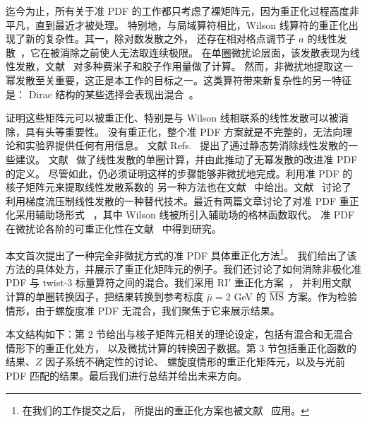 \medskip
迄今为止，所有关于准 PDF 的工作都只考虑了裸矩阵元，因为重正化过程高度非平凡，直到最近才被处理。
特别地，与局域算符相比，Wilson 线算符的重正化出现了新的复杂性。其一，除对数发散之外，
还存在相对格点调节子 $a$ 的线性发散~\cite{Dotsenko:1979wR}，它在被消除之前使人无法取连续极限。
在单圈微扰论层面，该发散表现为线性发散，文献~\cite{Constantinou:2017sej} 对多种费米子和胶子作用量做了计算。
然而，非微扰地提取这一幂发散至关重要，这正是本工作的目标之一。这类算符带来新复杂性的另一特征是：
Dirac 结构的某些选择会表现出混合~\cite{Constantinou:2017sej}。

\medskip
证明这些矩阵元可以被重正化、特别是与 Wilson 线相联系的线性发散可以被消除，具有头等重要性。
没有重正化，整个准 PDF 方案就是不完整的，无法向理论和实验界提供任何有用信息。
文献 Refs.~\cite{Ma:2014jla,Ishikawa:2016znu} 提出了通过静态势消除线性发散的一些建议。
文献~\cite{Chen:2016fxx} 做了线性发散的单圈计算，并由此推动了无幂发散的改进准 PDF 的定义。
尽管如此，仍必须证明这样的步骤能够非微扰地完成。利用准 PDF 的核子矩阵元来提取线性发散系数的
另一种方法也在文献~\cite{Constantinou:2017sej} 中给出。文献~\cite{Monahan:2016bvm} 讨论了
利用梯度流压制线性发散的一种替代技术。最近有两篇文章讨论了对准 PDF 重正化采用辅助场形式
~\cite{Ji:2017oey,Green:2017xeu}，其中 Wilson 线被所引入辅助场的格林函数取代。
准 PDF 在微扰论各阶的可重正化性在文献~\cite{Ishikawa:2017faj} 中得到研究。

\medskip
本文首次提出了一种完全非微扰方式的准 PDF 具体重正化方法\footnote{在我们的工作提交之后，
所提出的重正化方案也被文献~\cite{Chen:2017mzz} 应用。}。
我们给出了该方法的具体处方，并展示了重正化矩阵元的例子。我们还讨论了如何消除非极化准 PDF
与 twist-3 标量算符之间的混合。我们采用 RI$'$ 重正化方案~\cite{Martinelli:1994ty}，
并利用文献~\cite{Constantinou:2017sej} 计算的单圈转换因子，把结果转换到参考标度 $\bar\mu{=}2$ GeV 的
${\overline{\rm MS}}$ 方案。作为检验情形，由于螺旋度准 PDF 无混合，我们聚焦于它来展示结果。

\medskip
本文结构如下：第 2 节给出与核子矩阵元相关的理论设定，包括有混合和无混合情形下的重正化处方，
以及微扰计算的转换因子数据。第 3 节包括重正化函数的结果、$Z$ 因子系统不确定性的讨论、
螺旋度情形的重正化矩阵元，以及与光前 PDF 匹配的结果。最后我们进行总结并给出未来方向。
